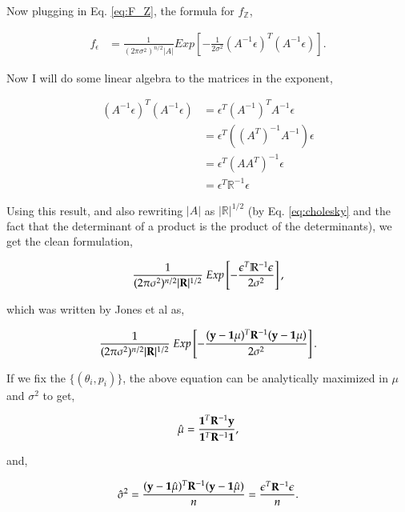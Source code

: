 Now plugging in Eq. \ref{eq:F_Z}, the formula for $f_\mathbb{Z}$, 

\begin{align} \label{eq:getting_F_Y}
f_\epsilon &= \frac{1}{(2\pi\sigma^2)^{n/2}|A|} {E}xp\left [ -\frac{1}{2\sigma^2}(A^{-1}\epsilon)^T(A^{-1}\epsilon)\right ].
\end{align}

Now I will do some linear algebra to the matrices in the exponent,

\begin{align}
(A^{-1}\epsilon)^T(A^{-1}\epsilon) &= \epsilon^T(A^{-1})^TA^{-1}\epsilon \nonumber\\
			 						 &= \epsilon^T((A^T)^{-1}A^{-1})\epsilon\nonumber\\
									 &= \epsilon^T(AA^T)^{-1}\epsilon\nonumber\\
									 &= \epsilon^T\mathbb{R}^{-1}\epsilon
\end{align}

Using this result, and also rewriting $|A|$ as $|\mathbb{R}|^{1/2}$ (by Eq. \ref{eq:cholesky} and the fact that the determinant of a product is the product of the determinants), we get the clean formulation,

\begin{equation} \label{eq:likelihood1}
\frac{1}
  {(2\pi\sigma^2)^{n/2}|\mb{R}|^{1/2}}\ 
Exp \left 
  [ -\frac
    {\epsilon^T\mathbb{R}^{-1}\epsilon}
    {2\sigma^2} 
\right ],
\end{equation}

which was written by Jones et al as,

\begin{equation} \label{eq:likelihood}
\frac{1}
  {(2\pi\sigma^2)^{n/2}|\mb{R}|^{1/2}}\ 
Exp \left 
  [ -\frac
    {(\mb{y}-\mb{1}\mu)^T\mb{R}^{-1}(\mb{y}-\mb{1}\mu)}
    {2\sigma^2} 
\right ].
\end{equation}

If we fix the $\{(\theta_i,p_i)\}$, the above equation can be analytically maximized in $\mu$ and $\sigma^2$ \citep{jones_efficient_1998} to get,

\begin{equation} \label{eq:mu_hat}
\hat{\mu}=\frac
	{\mathbf{1}^T\mathbf{R}^{-1}\mathbf{y}}
	{\mathbf{1}^T\mathbf{R}^{-1}\mathbf{1}},
\end{equation}


and,

\begin{equation} \label{eq:sig_hat}
\hat{\sigma}^2
    = \frac{(\mathbf{y}-\mathbf{1}\hat{\mu})^T\mathbf{R}^{-1}(\mathbf{y}-\mathbf{1}\hat{\mu})}{n} 
	= \frac{\epsilon^T\mathbf{R}^{-1}\epsilon}{n}.
\end{equation}

